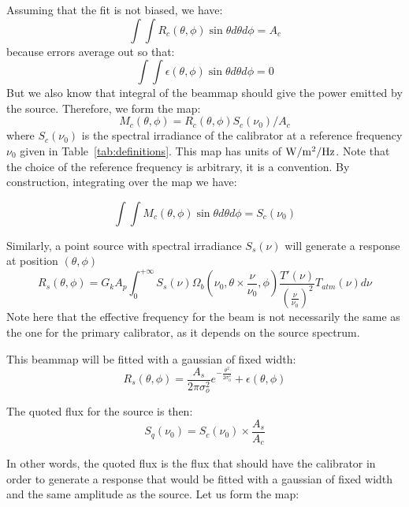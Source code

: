 Assuming that the fit is not biased, we have:
\begin{equation} 
\int\int R_{c}(\theta, \phi) \sin \theta d\theta d\phi = A_{c}
\end{equation}
because errors average out so that:
\begin{equation} 
\int\int \epsilon (\theta, \phi) \sin \theta d\theta d\phi = 0
\end{equation}
But we also know that integral of the beammap should give the power
emitted by the source. Therefore, we form the map:
\begin{equation}
M_{c}(\theta, \phi) = R_{c}(\theta, \phi)   S_{c} (\nu_{0}) / A_{c}
\end{equation}
where  $S_{c} (\nu_{0})$ is the spectral irradiance of the calibrator
at a reference frequency $\nu_{0}$ given in
Table~\ref{tab:definitions}. This map has units of $\rm W/m^{2}/Hz$. Note
that the choice of the reference frequency is arbitrary, it is a
convention. By construction, integrating over the map we have:

\begin{equation}
\int\int M_{c}(\theta, \phi) \sin \theta d\theta d\phi = S_{c}(\nu_{0})
\end{equation}

Similarly, a point source with spectral irradiance $S_{s}(\nu)$ will
generate a response at position $(\theta, \phi)$
\begin{equation}
R_{s}(\theta, \phi) =  G_{k} A_{p}  \int_{0}^{+\infty}
S_{s}(\nu) \Omega_{b}(\nu_{0}, \theta \times \frac{\nu}{\nu_{0}},
\phi) \frac{T'(\nu)}{\left(\frac{\nu}{\nu_{0}}\right)^{2}}
T_{atm}(\nu) d\nu
\end{equation}
Note here that the effective frequency for the beam is not necessarily
the same as the one for the primary calibrator, as it depends on the
source spectrum.


This beammap will be fitted with a gaussian of fixed width:
\begin{equation} 
R_{s}(\theta, \phi)  = \frac{A_{s}}{2 \pi \sigma_{o}^{2}}
e^{-\frac{\theta^{2}}{2\sigma_{0}^{2}}}  + \epsilon(\theta, \phi)
\end{equation}

The quoted flux for the source is then:
\begin{equation}
S_{q}(\nu_{0}) =  S_{c} (\nu_{0})  \times \frac{A_{s}}{A_{c}}
\end{equation}

In other words, the quoted flux is the flux that should have the
calibrator in order to generate a response that would be fitted with a
gaussian of fixed width and the same amplitude as the source.
Let us form the map:

